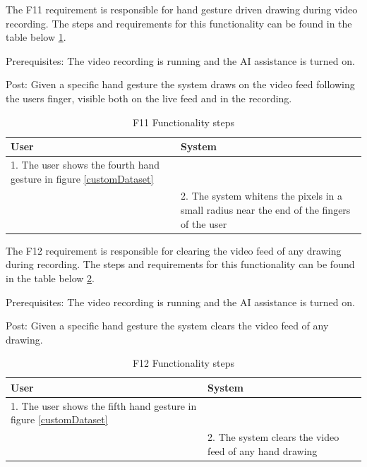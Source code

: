 \par The F11 requirement is responsible for hand gesture driven drawing during video recording. The steps and requirements for this functionality can be found in the table below \ref{F11Table}.
\par Prerequisites: The video recording is running and the AI assistance is turned on.
\par Post: Given a specific hand gesture the system draws on the video feed following the users finger, visible both on the live feed and in the recording.

\begin{table}[htbp]
\begin{center}
\begin{tabular}
{|p{180pt}|p{180pt}|}
\hline
 User & System\\
\hline 
\hline 1. The user shows the fourth hand gesture in figure \ref{customDataset} &  \\
\hline  & 2. The system whitens the pixels in a small radius near the end of the fingers of the user \\
\hline
\end{tabular}
\end{center}
\caption{F11 Functionality steps}
\label{F11Table}
\end{table}

\par The F12 requirement is responsible for clearing the video feed of any drawing during recording. The steps and requirements for this functionality can be found in the table below \ref{F12Table}.
\par Prerequisites: The video recording is running and the AI assistance is turned on.
\par Post: Given a specific hand gesture the system clears the video feed of any drawing.

\begin{table}[htbp]
\begin{center}
\begin{tabular}
{|p{180pt}|p{180pt}|}
\hline
 User & System\\
\hline 
\hline 1. The user shows the fifth hand gesture in figure \ref{customDataset} &  \\
\hline  & 2. The system clears the video feed of any hand drawing \\
\hline
\end{tabular}
\end{center}
\caption{F12 Functionality steps}
\label{F12Table}
\end{table}

